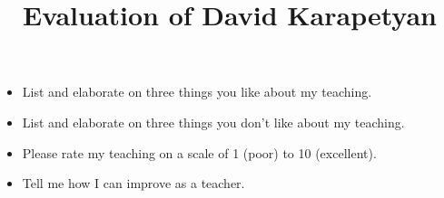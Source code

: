 \documentclass[12pt]{article}
\begin{document}
\title{ \large{
Evaluation of David Karapetyan \\
}}
\author{}
\date{}
\maketitle
\thispagestyle{empty}
\begin{itemize}

	\item List and elaborate on three things you like about my teaching.
		\vspace{4cm}

	\item List and elaborate on three things you don't like about my teaching.
		\vspace{4cm}

	\item Please rate my teaching on a scale of 1 (poor) to 10 (excellent).
		\vspace{4cm}


	\item Tell me how I can improve as a teacher. 
\end{itemize}
\end{document}
